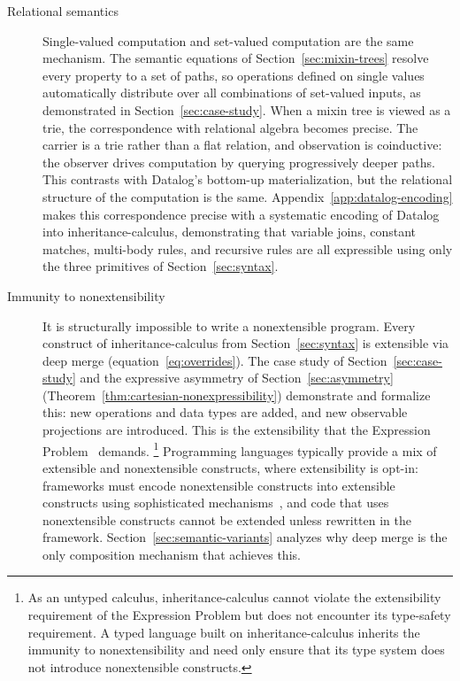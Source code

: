 \begin{description}
  \item[Relational semantics]
    Single-valued computation and set-valued computation are
    the same mechanism.
    The semantic equations of Section~\ref{sec:mixin-trees}
    resolve every property to a set of paths, so operations
    defined on single values automatically distribute over
    all combinations of set-valued inputs,
    as demonstrated in Section~\ref{sec:case-study}.
    When a mixin tree is viewed as a trie, the correspondence
    with relational algebra becomes precise.
    The carrier is a trie rather than a flat relation, and
    observation is coinductive: the observer drives computation
    by querying progressively deeper paths.
    This contrasts with
    Datalog's bottom-up materialization, but the relational
    structure of the computation is the same.
    Appendix~\ref{app:datalog-encoding} makes this correspondence
    precise with a systematic encoding of Datalog into
    inheritance-calculus, demonstrating that variable joins,
    constant matches, multi-body rules, and recursive rules are
    all expressible using only the three primitives of
    Section~\ref{sec:syntax}.

  \item[Immunity to nonextensibility]\label{item:immunity}
    It is structurally impossible to write a nonextensible program.
    Every construct of inheritance-calculus
    from Section~\ref{sec:syntax} is extensible via deep merge
    (equation~\ref{eq:overrides}).
    The case study of Section~\ref{sec:case-study} and the
    expressive asymmetry of Section~\ref{sec:asymmetry}
    (Theorem~\ref{thm:cartesian-nonexpressibility}) demonstrate
    and formalize this: new operations and data types are added,
    and new observable projections are introduced.
    This is the extensibility that the
    Expression Problem~\cite{wadler1998-expression-problem} demands.%
    \footnote{
      As an untyped calculus, inheritance-calculus cannot violate
      the extensibility requirement of the Expression Problem but does
      not encounter its type-safety requirement.
      A typed language built on
      inheritance-calculus inherits the immunity to nonextensibility and need
      only ensure that its type system does not introduce
      nonextensible constructs.
    }
    Programming languages typically provide a mix of extensible and
    nonextensible constructs, where extensibility is opt-in:
    frameworks must encode nonextensible constructs into extensible
    constructs using sophisticated
    mechanisms~\cite{liang1995-monad-transformers, lammel2003-scrap-your-boilerplate, loh2006-open-data-types,
      swierstra2008-data-types-a-la-carte, carette2009-finally-tagless, oliveira2012-object-algebras,
      kiselyov2013-extensible-effects, wu2014-effect-handlers-in-scope, kiselyov2015-freer-monads,
    wang2016-expression-problem-trivially, leijen2017-row-typed-algebraic-effects, poulsen2023-hefty-algebras},
    and code that uses nonextensible constructs
    cannot be extended unless rewritten in the framework.
    Section~\ref{sec:semantic-variants} analyzes why deep merge
    is the only composition mechanism that achieves this.


\end{description}
